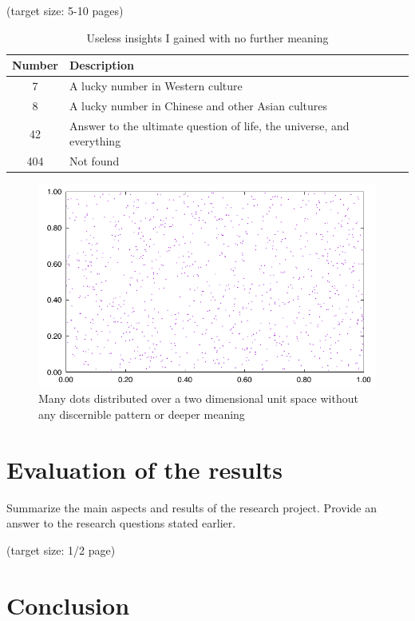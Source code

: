 \documentclass[a4paper,11pt,oneside]{article}
\begin{document}
    (target size: 5-10 pages)

    \begin{table}[ht]
        \begin{center}
            \begin{tabular}{cl}
                \toprule
                Number & Description                                                           \\
                \midrule
                7      & A lucky number in Western culture                                     \\
                8      & A lucky number in Chinese and other Asian cultures                    \\
                42     & Answer to the ultimate question of life, the universe, and everything \\
                404    & Not found                                                             \\
                \bottomrule
            \end{tabular}
            \caption{Useless insights I gained with no further meaning}
        \end{center}
    \end{table}

    \begin{figure}[ht]
        \begin{center}
            \includegraphics[width=.8\textwidth]{bsc-plot}
        \end{center}
        \caption{Many dots distributed over a two dimensional unit space
        without any discernible pattern or deeper meaning}
    \end{figure}


    \section{Evaluation of the results}

    Summarize the main aspects and results of the research
    project. Provide an answer to the research questions stated earlier.

    (target size: 1/2 page)


    \section{Conclusion}~\nocite{JS06}

    \newpage
    \printbibliography
\end{document}
